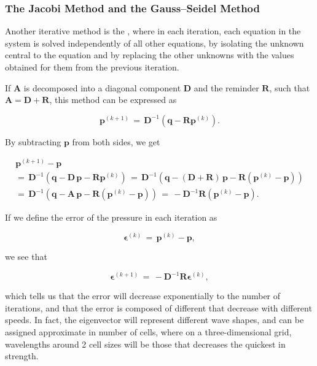 \subsubsection{The Jacobi Method and the Gauss--Seidel Method}

Another iterative method is the , where in each iteration, each equation in the system is solved independently of all other equations, by isolating the unknown central to the equation and by replacing the other unknowns with the values obtained for them from the previous iteration.

If $\mathbf{A}$ is decomposed into a diagonal component $\mathbf{D}$ and the reminder $\mathbf{R}$, such that $\mathbf{A} = \mathbf{D} + \mathbf{R}$, this method can be expressed as

\begin{equation} \label{eq:jacobi_method}
\mathbf{p}^{(k+1)} \,=\, \mathbf{D}^{-1}(\mathbf{q} - \mathbf{R}\mathbf{p}^{(k)}).
\end{equation}

By subtracting $\mathbf{p}$ from both sides, we get

\begin{equation}
\begin{array}{c}
\mathbf{p}^{(k+1)} - \mathbf{p} \\
=\, \mathbf{D}^{-1}(\mathbf{q} - \mathbf{D}\,\mathbf{p} - \mathbf{R}\mathbf{p}^{(k)}) \,=\, \mathbf{D}^{-1}(\mathbf{q} - (\mathbf{D} + \mathbf{R})\,\mathbf{p} - \mathbf{R}(\mathbf{p}^{(k)} - \mathbf{p})) \\
=\, \mathbf{D}^{-1}(\mathbf{q} - \mathbf{A}\,\mathbf{p} - \mathbf{R}(\mathbf{p}^{(k)} - \mathbf{p})) \,=\, -\mathbf{D}^{-1}\mathbf{R}(\mathbf{p}^{(k)} - \mathbf{p}).
\end{array}
\end{equation}

If we define the error of the pressure in each iteration as

\begin{equation} \label{eq:pressure_error}
\mathbf{\epsilon}^{(k)} \,=\, \mathbf{p}^{(k)} - \mathbf{p},
\end{equation}

we see that

\begin{equation} \label{eq:jacobi_method_error}
\mathbf{\epsilon}^{(k+1)} \,=\, -\mathbf{D}^{-1}\mathbf{R}\mathbf{\epsilon}^{(k)},
\end{equation}

which tells us that the error will decrease exponentially to the number of iterations, and that the error is composed of different \eigenvectors that decrease with different speeds. In fact, the eigenvector will represent different wave shapes, and can be assigned approximate \wavelengths in number of cells, where on a three-dimensional grid, wavelengths around 2 cell sizes will be those that decreases the quickest in strength.

